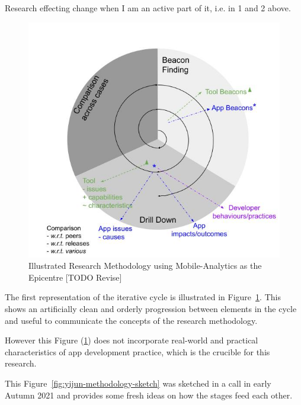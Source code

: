 Research effecting change when I am an active part of it, i.e. in 1 and 2 above.




\begin{figure}
    \centering
    \includegraphics[width=14cm]{images/my/Illustrated-Research-Methodology-using-Mobile-Analytics-as-the-Epicentre-v0-2.jpeg}
    \caption{Illustrated Research Methodology using Mobile-Analytics as the Epicentre [TODO Revise]}
    \label{fig:Illustrated-Research-Methodology-using-Mobile-Analytics-as-the-Epicentre}
\end{figure}

The first representation of the iterative cycle is illustrated in Figure~\ref{fig:Illustrated-Research-Methodology-using-Mobile-Analytics-as-the-Epicentre}. This shows an artificially clean and orderly progression between elements in the cycle and useful to communicate the concepts of the research methodology. 

However this Figure (\ref{fig:Illustrated-Research-Methodology-using-Mobile-Analytics-as-the-Epicentre}) does not incorporate real-world and practical characteristics of app development practice, which is the crucible for this research.

This Figure~\ref{fig:yijun-methodology-sketch} was sketched in a call in early Autumn 2021 and provides some fresh ideas on how the stages feed each other.

